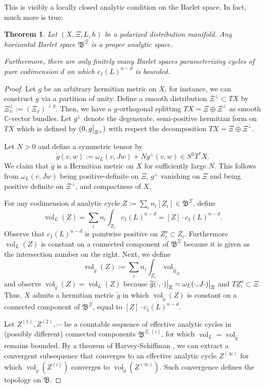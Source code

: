 \documentclass[10pt,letterpaper,english,reqno]{amsart}
\numberwithin{equation}{subsection}
\newcommand\fB{{\mathfrak B}}
\newcommand\C{{\mathbb C}}
\DeclareMathOperator{\vol}{vol}
\newtheorem{theorem}{Theorem}[section]
\theoremstyle{definition}
\begin{document}
This is visibly a locally closed analytic
condition on the Barlet space. In fact, much more is true:

\begin{theorem}\label{properness} Let $(X,\Xi,L,h)$ be a polarized distribution
manifold. Any horizontal Barlet space $\mathfrak{B}^{\Xi}$ is
a proper analytic space.

Furthermore, there are only finitely many Barlet spaces parameterizing cycles of pure codimension $d$ on which $c_1(L)^{n-d}$ is bounded.\end{theorem}

\begin{proof} Let $g$ be an arbitrary hermitian metric on $X$,
for instance, we can construct $g$ via a partition of unity.
Define a smooth distribution $\Xi^{\perp}\subset TX$ by
$\Xi^{\perp}_x := (\Xi_x)^{\perp g}$. Then, we have a $g$-orthogonal splitting 
$TX = \Xi\oplus \Xi^{\perp}$ as smooth $\C$-vector bundles.
Let $g^\perp$ denote the
degenerate, semi-positive hermitian form on $TX$ which is
defined by $(0,g\big{|}_{\Xi^{\perp}})$ with respect the
decomposition $TX =\Xi\oplus \Xi^{\perp}$.

Let $N>0$ and define a symmetric tensor by $$\widetilde{g}(v,w):=
\omega_L (v,Jw)+ Ng^\perp(v,w)\in S^2T^*X.$$
We claim that $\widetilde{g}$
is a Hermitian metric on $X$ for sufficiently large $N$. This 
follows from $\omega_L(v ,Jw)$
being positive-definite on $\Xi$, $g^\perp$ vanishing on $\Xi$ and
being positive definite on $\Xi^{\perp}$, and compactness of $X$.

For any codimension $d$ analytic cycle 
$Z:=\sum_i n_i[Z_i]\in \mathfrak{B}^{\Xi}$, define $$\vol_L(Z) 
= \sum_i n_i\int_{Z_i} c_1(L)^{n-d} = [Z]\cdot c_1(L)^{n-d}.$$
Observe that $c_1(L)^{n-d}$ is pointwise positive on $Z_i^o\subset Z_i$. 
Furthermore $\vol_L(Z)$ is constant
on a connected component of $\mathfrak{B}^{\Xi}$ because it is given
as the intersection number on the right. Next,
we define $$\vol_{\widetilde{g}}(Z):=\sum_i n_i \int_{Z_i} 
\vol_{\widetilde{g}|_{Z_i}}$$ and observe 
$\vol_{\widetilde{g}}(Z)=\vol_L(Z)$ because 
$\widetilde{g}(\cdot,\cdot)\big{|}_{\Xi} = \omega_L(\cdot,J\cdot)\big{|}_{\Xi}$ and $TZ_i^o\subset \Xi$.
Thus, $X$ admits a hermitian metric $\widetilde{g}$ in which
$\vol_{\widetilde{g}}(Z)$ is constant on a connected component of
$\mathfrak{B}^{\Xi}$, equal to $[Z]\cdot c_1(L)^{n-d}$.

Let $Z^{(1)},Z^{(2)},\cdots$ be a countable sequence of effective
analytic cycles in (possibly different) connected components 
$\mathfrak{B}^{\Xi,(i)}$, for which $\vol_L=\vol_{\widetilde{g}}$
remains bounded. By a theorem of Harvey-Schiffman 
\cite[Thm.~3.9]{harvey-shiffman},
we can extract a convergent subsequence
that converges to an effective analytic cycle $Z^{(\infty)}$
for which $\vol_{\widetilde{g}}(Z^{(i)})$ converges to 
$\vol_{\widetilde{g}}(Z^{(\infty)})$. Such convergence
defines the topology on $\fB$.


\end{proof}
\end{document}
